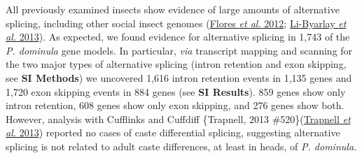 All previously examined insects show evidence of large amounts of
alternative splicing, including other social insect genomes
(\protect\hyperlink{ux5fENREFux5f11}{Flores \textit{et al.} 2012};
\protect\hyperlink{ux5fENREFux5f32}{Li-Byarlay \textit{et al.} 2013}). As
expected, we found evidence for alternative splicing in 1,743 of the
\textit{P. dominula} gene models. In particular, \textit{via} transcript
mapping and scanning for the two major types of alternative splicing
(intron retention and exon skipping, see \textbf{SI Methods}) we
uncovered 1,616 intron retention events in 1,135 genes and 1,720 exon
skipping events in 884 genes (see \textbf{SI Results}). 859 genes show
only intron retention, 608 genes show only exon skipping, and 276 genes
show both. However, analysis with Cufflinks and Cuffdiff \{Trapnell,
2013 \#520\}(\protect\hyperlink{ux5fENREFux5f64}{Trapnell \textit{et al.}
2013}) reported no cases of caste differential splicing, suggesting
alternative splicing is not related to adult caste differences, at least
in heads, of \textit{P. dominula.}

